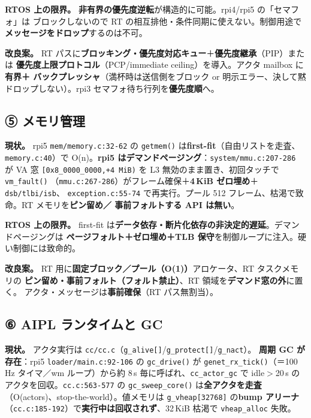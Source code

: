 \documentclass[11pt,a4paper]{article}
\newcommand{\code}[1]{\texttt{\small #1}}
\newcommand{\limt}[1]{\textbf{\textcolor{red!55!black}{#1}}}
\newcommand{\fix}[1]{\textbf{\textcolor{green!35!black}{#1}}}
\begin{document}
\limt{RTOS 上の限界。} \textbf{非有界の優先度逆転}が構造的に可能。rpi4/rpi5 の「セマフォ」は
ブロックしないので RT の相互排他・条件同期に使えない。制御用途で\textbf{メッセージをドロップ}するのは不可。

\fix{改良案。} RT パスに\textbf{ブロッキング・優先度対応キュー}＋\textbf{優先度継承}（PIP）または
\textbf{優先度上限プロトコル}（PCP/immediate ceiling）を導入。アクタ mailbox に\textbf{有界＋
バックプレッシャ}（満杯時は送信側をブロック or 明示エラー、決して黙ドロップしない）。rpi3
セマフォ待ち行列を\textbf{優先度順}へ。

\subsection{⑤ メモリ管理}
\textbf{現状。} rpi5 \code{mem/memory.c:32-62} の \code{getmem()} は\textbf{first-fit}（自由リストを走査、
\code{memory.c:40}）で O(n)。\limt{rpi5 はデマンドページング}：\code{system/mmu.c:207-286} が VA 窓
\code{[0x8\_0000\_0000,+4\,MiB)} を L3 無効のまま置き、初回タッチで \code{vm\_fault()}
（\code{mmu.c:267-286}）がフレーム確保＋\textbf{4\,KiB ゼロ埋め}＋\code{dsb/tlbi/isb}、
\code{exception.c:55-74} で再実行。プール 512 フレーム、枯渇で致命。RT メモリを\textbf{ピン留め／
事前フォルトする API は無い}。

\limt{RTOS 上の限界。} first-fit は\textbf{データ依存・断片化依存の非決定的遅延}。デマンドページングは
\textbf{ページフォルト＋ゼロ埋め＋TLB 保守}を制御ループに注入。硬い制御には致命的。

\fix{改良案。} RT 用に\textbf{固定ブロック／プール（O(1)）}アロケータ、RT タスクメモリの
\textbf{ピン留め・事前フォルト（フォルト禁止）}、RT 領域を\textbf{デマンド窓の外}に置く。
アクタ・メッセージは\textbf{事前確保}（RT パス無割当）。

\subsection{⑥ AIPL ランタイムと GC}
\textbf{現状。} アクタ実行は \code{cc/cc.c}（\code{g\_alive[]}/\code{g\_protect[]}/\code{g\_nact}）。
\limt{周期 GC が存在}：rpi5 \code{loader/main.c:92-106} の \code{gc\_drive()} が
\code{genet\_rx\_tick()}（＝100\,Hz タイマ／wm ループ）から約 8\,s 毎に呼ばれ、\code{cc\_actor\_gc}
で idle$>$20\,s のアクタを回収。\code{cc.c:563-577} の \code{gc\_sweep\_core()} は\textbf{全アクタを走査}
（O(actors)、stop-the-world）。値メモリは \code{g\_vheap[32768]} の\textbf{bump アリーナ}
（\code{cc.c:185-192}）で\textbf{実行中は回収されず}、32\,KiB 枯渇で \code{vheap\_alloc} 失敗。
\end{document}
